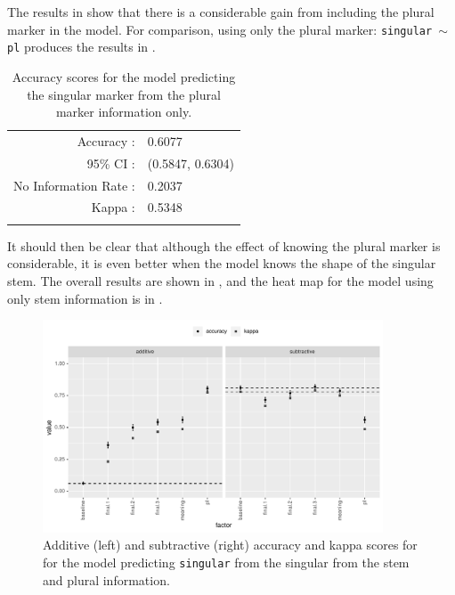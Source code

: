 The results in  show that there is a considerable gain from including the plural marker in the model. For comparison, using only the plural marker: \texttt{singular $\sim$ pl} produces the results in .

\begin{table}
  \centering
  \begin{tabular}{rl}
    \lsptoprule
    \multicolumn{2}{c}{Overall Statistics}   \\
    \midrule
    Accuracy :            & 0.6077           \\
    95\% CI :             & (0.5847, 0.6304) \\
    No Information Rate : & 0.2037           \\
    Kappa :               & 0.5348           \\
    \lspbottomrule
  \end{tabular}
  \caption{Accuracy scores for the model predicting the singular marker from the plural marker information only.}\label{tab:sg-marker-pl}
\end{table}

It should then be clear that although the effect of knowing the plural marker is considerable, it is even better when the model knows the shape of the singular stem. The overall results are shown in , and the heat map for the model using only stem information is in .

\begin{figure}
  \centering
  \includegraphics[width=0.9\textwidth]{./figures/kasem/p-fi-sgmark-sg-overall.pdf}
  \caption{Additive (left) and subtractive (right) accuracy and kappa scores for for the model predicting \texttt{singular} from the singular from the stem and plural information.}\label{fig:overall-fi-singular-sg}
\end{figure}


